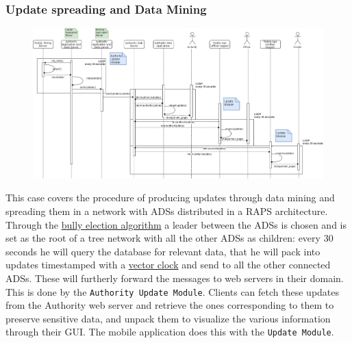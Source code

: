 \documentclass[12pt,a4paper]{article}
\begin{document}
\subsubsection{Update spreading and Data Mining}
\begin{figure}[H]
\begin{adjustwidth}{-25mm}{-25mm}
				\centering				
					        \includegraphics[width=0.75\paperwidth]{Images/update_sending}
\end{adjustwidth}
\end{figure}
This case covers the procedure of producing updates through data mining and spreading them in a network with ADSs distributed in a RAPS architecture. Through the \underline{bully election algorithm} a leader between the ADSs is chosen and is set as the root of a tree network with all the other ADSs as children: every 30 seconds he will query the database for relevant data, that he will pack into updates timestamped with a \underline{vector clock} and send to all the other connected ADSs. These will furtherly forward the messages to web servers in their domain. This is done by the \texttt{Authority Update Module}. Clients can fetch these updates from the Authority web server and retrieve the ones corresponding to them to preserve sensitive data, and unpack them to visualize the various information through their GUI. The mobile application does this with the \texttt{Update Module}.
\end{document}
